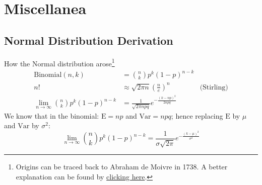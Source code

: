 \section*{Miscellanea}
\subsection*{Normal Distribution Derivation}
\begin{frame}[plain, noframenumbering, label=appendixnormal]{How the Normal
        distribution arose\footnote{Origins can be traced back to
            Abraham de Moivre in 1738.
            A better explanation can be found by
            \href{http://www.stat.yale.edu/~pollard/Courses/241.fall2014/notes2014/Bin.Normal.pdf}{clicking here}.}}
    $$
        \begin{aligned}
            \text{Binomial}(n, k)                            & = \binom{n}{k} p^k (1-p)^{n-k}                                                \\
            n!                                               & \approx \sqrt{2 \pi n} \left(\frac{n}{e}\right)^n         & \text{(Stirling)} \\
            \lim_{n \to \infty} \binom{n}{k} p^k (1-p)^{n-k} & = \frac{1}{\sqrt{2 \pi npq}} e^{-\frac{(k - np)^2}{2npq}}
        \end{aligned}
    $$
    We know that in the binomial: $\mathrm{E} = np$ and $\mathrm{Var} = npq$; hence replacing $\mathrm{E}$ by $\mu$ and $\mathrm{Var}$ by $\sigma^2$:
    $$\lim_{n \to \infty} \binom{n}{k} p^k (1-p)^{n-k} = \frac{1}{\sigma \sqrt{2 \pi}} e^{-\frac{(k - \mu)^2}{\sigma^2}}$$
\end{frame}